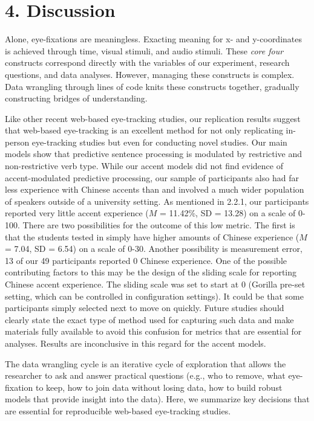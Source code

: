 \section{4. Discussion}
Alone, eye-fixations are meaningless. Exacting meaning for x- and y-coordinates is achieved
through time, visual stimuli, and audio stimuli. These \textit{core four} constructs correspond directly with the variables of our experiment, research questions, and data analyses. However, managing these constructs is complex. Data wrangling through lines of code knits these constructs together, gradually constructing bridges of understanding.

Like other recent web-based eye-tracking studies, our replication results suggest that web-based eye-tracking is an excellent method for not only replicating in-person eye-tracking studies \parencite{Vos_2017, Prystauka_Altmann_Rothman_2023} but even for conducting novel studies. Our main models show that predictive sentence processing is modulated by restrictive and non-restrictive verb type. While our accent models did not find evidence of accent-modulated predictive processing, our sample of participants also had far less experience with Chinese accents than \textcite{Porretta_et_al_2020} and involved a much wider population of speakers outside of a university setting. As mentioned in 2.2.1, our participants reported very little accent experience ($M$ = 11.42\%, SD = 13.28) on a scale of 0-100. There are two possibilities for the outcome of this low metric. The first is that the students tested in \textcite{Porretta_et_al_2020} simply have higher amounts of Chinese experience ($M$ = 7.04, SD = 6.54) on a scale of 0-30. Another possibility is measurement error, 13 of our 49 participants reported 0 Chinese experience. One of the possible contributing factors to this may be the design of the sliding scale for reporting Chinese accent experience. The sliding scale was set to start at 0 (Gorilla pre-set setting, which can be controlled in configuration settings). It could be that some participants simply selected next to move on quickly. Future studies should clearly state the exact type of method used for capturing such data and make materials fully available to avoid this confusion for metrics that are essential for analyses. Results are inconclusive in this regard for the accent models. 

The data wrangling cycle is an iterative cycle of exploration that allows the researcher to ask and answer practical questions (e.g., who to remove, what eye-fixation to keep, how to join data without losing data, how to build robust models that provide insight into the data). Here, we summarize key decisions that are essential for reproducible web-based eye-tracking studies.

